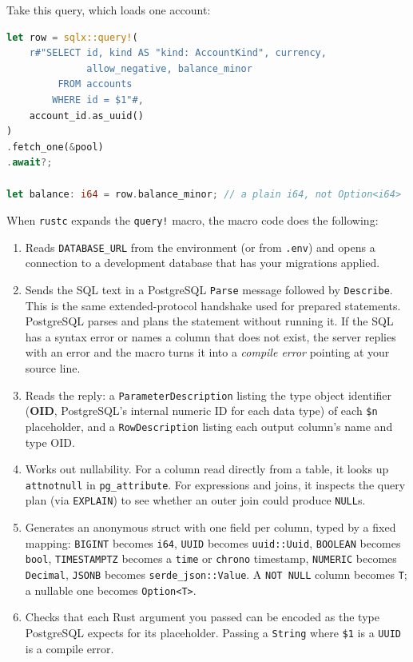 Take this query, which loads one account:

\begin{lstlisting}[language=Rust, caption={A compile-time checked query with SQLx.}]
let row = sqlx::query!(
    r#"SELECT id, kind AS "kind: AccountKind", currency,
              allow_negative, balance_minor
         FROM accounts
        WHERE id = $1"#,
    account_id.as_uuid()
)
.fetch_one(&pool)
.await?;

let balance: i64 = row.balance_minor; // a plain i64, not Option<i64>
\end{lstlisting}

When \texttt{rustc} expands the \texttt{query!} macro, the macro code does the following:
\begin{enumerate}
  \item Reads \texttt{DATABASE\_URL} from the environment (or from \texttt{.env}) and opens a connection to a development database that has your migrations applied.
  \item Sends the SQL text in a PostgreSQL \texttt{Parse} message followed by \texttt{Describe}. This is the same extended-protocol handshake used for prepared statements. PostgreSQL parses and plans the statement without running it. If the SQL has a syntax error or names a column that does not exist, the server replies with an error and the macro turns it into a \emph{compile error} pointing at your source line.
  \item Reads the reply: a \texttt{ParameterDescription} listing the type object identifier (\textbf{OID}, PostgreSQL's internal numeric ID for each data type) of each \texttt{\$n} placeholder, and a \texttt{RowDescription} listing each output column's name and type OID.
  \item Works out nullability. For a column read directly from a table, it looks up \texttt{attnotnull} in \texttt{pg\_attribute}. For expressions and joins, it inspects the query plan (via \texttt{EXPLAIN}) to see whether an outer join could produce \texttt{NULL}s.
  \item Generates an anonymous struct with one field per column, typed by a fixed mapping: \texttt{BIGINT} becomes \texttt{i64}, \texttt{UUID} becomes \texttt{uuid::Uuid}, \texttt{BOOLEAN} becomes \texttt{bool}, \texttt{TIMESTAMPTZ} becomes a \texttt{time} or \texttt{chrono} timestamp, \texttt{NUMERIC} becomes \texttt{Decimal}, \texttt{JSONB} becomes \texttt{serde\_json::Value}. A \texttt{NOT NULL} column becomes \texttt{T}; a nullable one becomes \texttt{Option<T>}.
  \item Checks that each Rust argument you passed can be encoded as the type PostgreSQL expects for its placeholder. Passing a \texttt{String} where \texttt{\$1} is a \texttt{UUID} is a compile error.
\end{enumerate}

